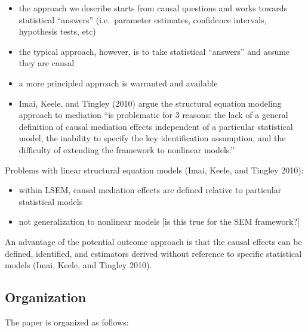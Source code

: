 \documentclass[]{article}
\providecommand{\tightlist}{%
  \setlength{\itemsep}{0pt}\setlength{\parskip}{0pt}}
\begin{document}
\begin{itemize}
\tightlist
\item
  the approach we describe starts from causal questions and works
  towards statistical ``answers'' (i.e.~parameter estimates, confidence
  intervals, hypothesis tests, etc)
\item
  the typical approach, however, is to take statistical ``answers'' and
  assume they are causal
\item
  a more principled approach is warranted and available
\item
  Imai, Keele, and Tingley (2010) argue the structural equation modeling
  approach to mediation ``is problematic for 3 reasons: the lack of a
  general definition of causal mediation effects independent of a
  particular statistical model, the inability to specify the key
  identification assumption, and the difficulty of extending the
  framework to nonlinear models.''
\end{itemize}

Problems with linear structural equation models (Imai, Keele, and
Tingley 2010):

\begin{itemize}
\tightlist
\item
  within LSEM, causal mediation effects are defined relative to
  particular statistical models
\item
  not generalization to nonlinear models {[}is this true for the SEM
  framework?{]}
\end{itemize}

An advantage of the potential outcome approach is that the causal
effects can be defined, identified, and estimators derived without
reference to specific statistical models (Imai, Keele, and Tingley
2010).

\subsection{Organization}\label{organization}

The paper is organized as follows:
\end{document}
